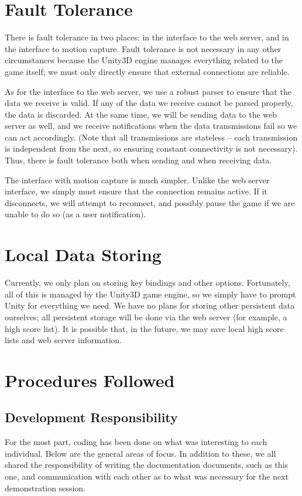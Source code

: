 \documentclass[10pt,letterpaper,oneside,english]{article}
\begin{document}
\section{Fault Tolerance}
There is fault tolerance in two places: in the interface to the web server, and in the interface to motion capture. Fault tolerance is not necessary in any other circumstances because the Unity3D engine manages everything related to the game itself; we must only directly ensure that external connections are reliable.

As for the interface to the web server, we use a robust parser to ensure that the data we receive is valid. If any of the data we receive cannot be parsed properly, the data is discarded. At the same time, we will be sending data to the web server as well, and we receive notifications when the data transmissions fail so we can act accordingly. (Note that all transmissions are stateless -- each transmission is independent from the next, so ensuring constant connectivity is not necessary). Thus, there is fault tolerance both when sending and when receiving data.

The interface with motion capture is much simpler. Unlike the web server interface, we simply must ensure that the connection remains active. If it disconnects, we will attempt to reconnect, and possibly pause the game if we are unable to do so (as a user notification).

\section{Local Data Storing}
Currently, we only plan on storing key bindings and other options. Fortunately, all of this is managed by the Unity3D game engine, so we simply have to prompt Unity for everything we need. We have no plans for storing other persistent data ourselves; all persistent storage will be done via the web server (for example, a high score list). It is possible that, in the future, we may save local high score lists and web server information.

\section{Procedures Followed}
\subsection{Development Responsibility}
For the most part, coding has been done on what was interesting to each individual. Below are the general areas of focus. In addition to these, we all shared the responsibility of writing the documentation documents, such as this one, and communication with each other as to what was necessary for the next demonstration session.
\end{document}
